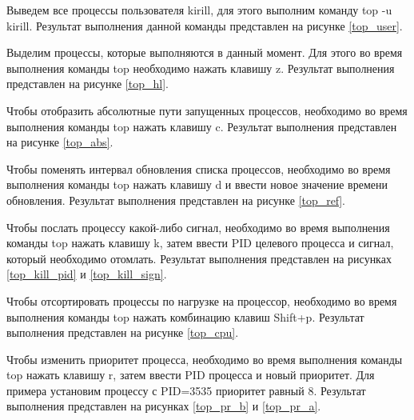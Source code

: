 
Выведем все процессы пользователя kirill, для этого выполним команду top -u kirill. Результат выполнения данной команды представлен на рисунке \ref{top_user}.


Выделим процессы, которые выполняются в данный момент. Для этого во время выполнения команды top необходимо нажать клавишу z. Результат выполнения представлен на рисунке \ref{top_hl}.


Чтобы отобразить абсолютные пути запущенных процессов, необходимо во время выполнения команды top нажать клавишу c. Результат выполнения представлен на рисунке \ref{top_abs}.


Чтобы поменять интервал обновления списка процессов, необходимо во время выполнения команды top нажать клавишу d и ввести новое значение времени обновления. Результат выполнения представлен на рисунке \ref{top_ref}.


Чтобы послать процессу какой-либо сигнал, необходимо во время выполнения команды top нажать клавишу k, затем ввести PID целевого процесса и сигнал, который необходимо отомлать. Результат выполнения представлен на рисунках \ref{top_kill_pid} и \ref{top_kill_sign}.


Чтобы отсортировать процессы по нагрузке на процессор, необходимо во время выполнения команды top нажать комбинацию клавиш Shift+p. Результат выполнения представлен на рисунке \ref{top_cpu}.


Чтобы изменить приоритет процесса, необходимо во время выполнения команды top нажать клавишу r, затем ввести PID процесса и новый приоритет. Для примера установим процессу с PID=3535 приоритет равный 8. Результат выполнения представлен на рисунках \ref{top_pr_b} и \ref{top_pr_a}.


